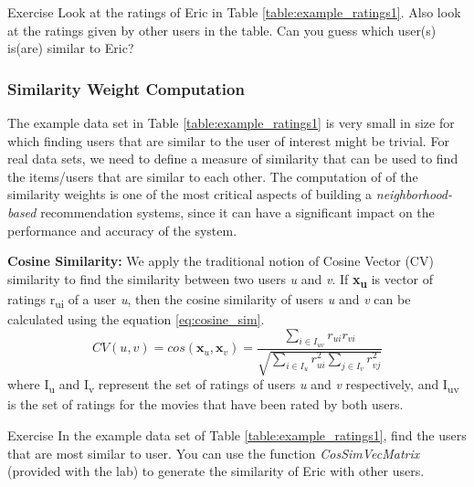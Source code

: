 \begin{myremark}{Exercise }
Look at the ratings of Eric in Table \ref{table:example_ratings1}. Also look at the ratings given by other users in the table. Can you guess which user(s) is(are) similar to Eric?
\end{myremark}

\subsubsection{Similarity Weight Computation}
The example data set in Table \ref{table:example_ratings1} is very small in size for which finding users that are similar to the user of interest might be trivial. For real data sets, we need to define a measure of similarity that can be used to find the items/users that are similar to each other. The computation of of the similarity weights is one of the most critical aspects of building a \textit{neighborhood-based} recommendation systems, since it can have a significant impact on the performance and accuracy of the system.

\textbf{Cosine Similarity:} We apply the traditional notion of Cosine Vector (CV) similarity to find the similarity between two users \textit{u} and \textit{v}. If \textbf{x\textsubscript{u}} is vector of ratings r\textsubscript{ui} of a user \textit{u}, then the cosine similarity of users \textit{u} and \textit{v} can be calculated using the equation \ref{eq:cosine_sim}.
 \begin{equation} \label{eq:cosine_sim}
CV(u,v) = cos(\textbf{x}_{u}, \textbf{x}_{v}) = \frac
{\sum_{i \in{I_{uv}}}^{}{r_{ui}r_{vi}}}
{\sqrt	{	\sum_{i \in{I_{u}}}^{}{r_{ui}^2}	\sum_{j \in{I_{v}}}^{}{r_{vj}^2}}		}
\end{equation}
where I\textsubscript{u} and I\textsubscript{v} represent the set of ratings of users \textit{u} and \textit{v} respectively, and I\textsubscript{uv} is the set of ratings for the movies that have been rated by both users.

\begin{myremark}{Exercise }
In the example data set of Table \ref{table:example_ratings1}, find the users that are most similar to user. You can use the function \textit{CosSimVecMatrix} (provided with the lab) to generate the similarity of Eric with other users.
\end{myremark}

